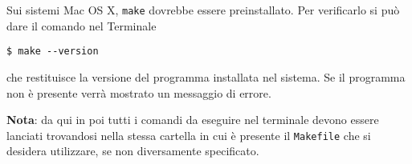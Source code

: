 Sui sistemi Mac OS X, \texttt{make} dovrebbe essere preinstallato.  Per
verificarlo si può dare il comando nel Terminale
\begin{verbatim}
$ make --version
\end{verbatim} %
che restituisce la versione del programma installata nel sistema.  Se il
programma non è presente verrà mostrato un messaggio di errore.

\textbf{Nota}: da qui in poi tutti i comandi da eseguire nel terminale devono
essere lanciati trovandosi nella stessa cartella in cui è presente il
\texttt{Makefile} che si desidera utilizzare, se non diversamente specificato.


